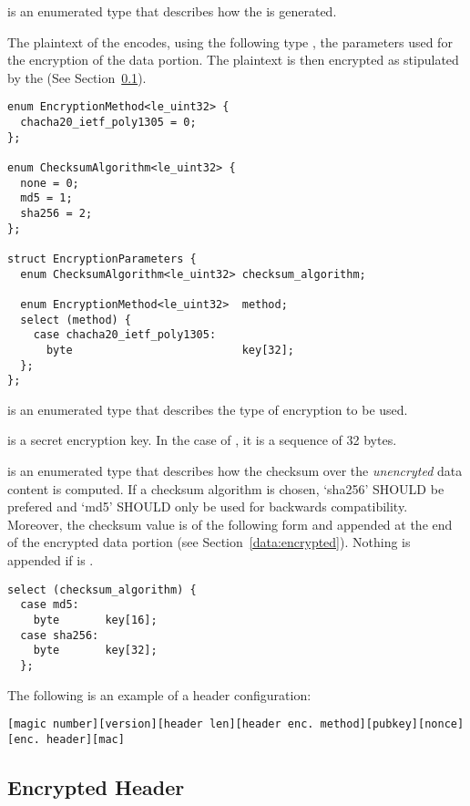  is an enumerated type that describes how the  is generated.

The plaintext of the  encodes, using the following type , the parameters used for the encryption of the data portion.
%
The plaintext is then encrypted as stipulated by the  (See Section~\ref{header:encrypted}).

\begin{verbatim}
enum EncryptionMethod<le_uint32> {
  chacha20_ietf_poly1305 = 0;
};

enum ChecksumAlgorithm<le_uint32> {
  none = 0;
  md5 = 1;
  sha256 = 2;
};

struct EncryptionParameters {
  enum ChecksumAlgorithm<le_uint32> checksum_algorithm;

  enum EncryptionMethod<le_uint32>  method;
  select (method) {
    case chacha20_ietf_poly1305:
      byte                          key[32];
  };
};
\end{verbatim}

 is an enumerated type that describes the type of encryption to be used.

 is a secret encryption key.
%
In the case of , it is a sequence of 32 bytes.

 is an enumerated type that describes how the checksum over the \emph{unencryted} data content is computed.
%
If a checksum algorithm is chosen, `sha256' SHOULD be prefered and `md5' SHOULD only be used for backwards compatibility.
%
Moreover, the checksum value is of the following form and appended at the end of the encrypted data portion (see Section~\ref{data:encrypted}). Nothing is appended if  is .
%
\begin{verbatim}
select (checksum_algorithm) {
  case md5:
    byte       key[16];
  case sha256:
    byte       key[32];
  };
\end{verbatim}

The following is an example of a header configuration:
%
\begin{verbatim}
[magic number][version][header len][header enc. method][pubkey][nonce][enc. header][mac]
\end{verbatim}


\subsection{Encrypted Header}\label{header:encrypted}

